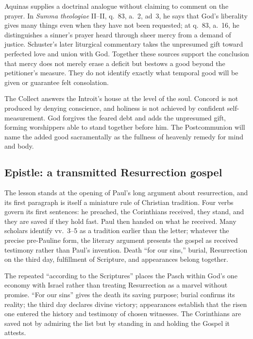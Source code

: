 Aquinas supplies a doctrinal analogue without claiming to comment on the
prayer. In \emph{Summa theologiae} II--II, q.~83, a.~2, ad~3, he says that
God's liberality gives many things even when they have not been requested;
at q.~83, a.~16, he distinguishes a sinner's prayer heard through sheer mercy
from a demand of justice. Schuster's later liturgical commentary takes the
unpresumed gift toward perfected love and union with God. Together these
sources support the conclusion that mercy does not merely erase a deficit but bestows a good
beyond the petitioner's measure. They do not
identify exactly what temporal good will be given or guarantee felt
consolation.

The Collect answers the Introit's house at the level of the soul. Concord is
not produced by denying conscience, and holiness is not achieved by confident
self-measurement. God forgives the feared debt and adds the unpresumed gift,
forming worshippers able to stand together before him. The Postcommunion will
name the added good sacramentally as the fullness of heavenly remedy for mind
and body.

\subsection*{Epistle: a transmitted Resurrection gospel\enspace{}}

The lesson stands at the opening of Paul's long argument about resurrection,
and its first paragraph is itself a miniature rule of Christian tradition.
Four verbs govern its first sentences: he preached, the Corinthians received,
they stand, and they are saved if they hold fast. Paul then handed on what he
received. Many scholars identify vv.~3--5 as a tradition earlier than the
letter; whatever the precise pre-Pauline form, the literary argument presents
the gospel as received testimony rather than Paul's invention. Death ``for
our sins,'' burial, Resurrection on the third day, fulfillment of Scripture,
and appearances belong together.

The repeated ``according to the Scriptures'' places the Pasch within God's one
economy with Israel rather than treating Resurrection as a marvel without
promise. ``For our sins'' gives the death its saving purpose; burial confirms
its reality; the third day declares divine victory; appearances establish that
the risen one entered the history and testimony of chosen witnesses. The
Corinthians are saved not by admiring the list but by standing in and holding
the Gospel it attests.


